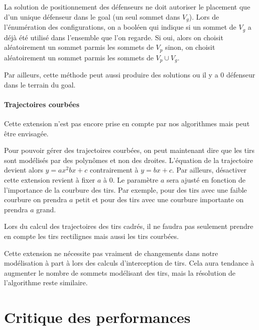 \documentclass[12pt]{article}
\begin{document}
La solution de positionnement des défenseurs ne doit autoriser le placement que d'un unique défenseur dans le goal (un seul sommet dans $V_g$).
Lors de l'énumération des configurations, on a booléen qui indique si un sommet de $V_g$ a déjà été utilisé dans l'ensemble que l'on regarde. Si oui, alors on choisit aléatoirement un sommet parmis les sommets de $V_p$ sinon, on choisit aléatoirement un sommet parmis les sommets de $V_p \cup V_g$.

Par ailleurs, cette méthode peut aussi produire des solutions ou il y a 0 défenseur dans le terrain du goal.

\paragraph{Trajectoires courbées}
Cette extension n'est pas encore prise en compte par nos algorithmes mais peut être envisagée.

Pour pouvoir gérer des trajectoires courbées, on peut maintenant dire que les tirs sont modélisés par des polynômes et non des droites. L'équation de la trajectoire devient alors $y = ax^2 bx + c$ contrairement à $y = bx+c$. Par ailleurs, désactiver cette extension revient à fixer $a$ à 0. Le paramètre $a$ sera ajusté en fonction de l'importance de la courbure des tirs. Par exemple, pour des tirs avec une faible courbure on prendra $a$ petit et pour des tirs avec une courbure importante on prendra $a$ grand.

Lors du calcul des trajectoires des tirs cadrés, il ne faudra pas seulement prendre en compte les tirs rectilignes mais aussi les tirs courbées.

Cette extension ne nécessite pas vraiment de changements dans notre modélisation à part à lors des calculs d'interception de tirs. Cela aura tendance à augmenter le nombre de sommets modélisant des tirs, mais la résolution de l'algorithme reste similaire.

\section{Critique des performances}
\end{document}
